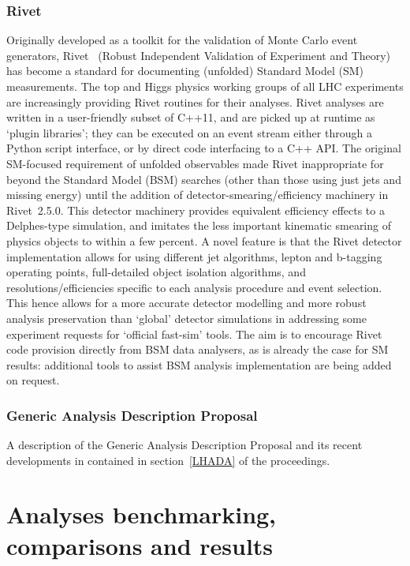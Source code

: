 \documentclass[11pt]{cernrep}
\begin{document}
\subsubsection{Rivet}
Originally developed as a toolkit for the validation of Monte Carlo event
generators, Rivet~\cite{Waugh:2006ip,Buckley:2010ar} (Robust Independent Validation of Experiment and
Theory) has become a standard for documenting (unfolded) Standard Model (SM)
measurements. The top and Higgs physics working groups of all LHC experiments
are increasingly providing Rivet routines for their analyses. Rivet analyses are
written in a user-friendly subset of C++11, and are picked up at runtime as
`plugin libraries'; they can be executed on an event stream either through a Python script interface, or by direct code interfacing to a C++ API.
The original SM-focused requirement of unfolded observables made Rivet
inappropriate for beyond the Standard Model (BSM) searches (other than those
using just jets and missing energy) until the addition of
detector-smearing/efficiency machinery in Rivet~2.5.0. This detector machinery provides equivalent efficiency effects to a Delphes-type simulation, and imitates the less important kinematic smearing of physics objects to within a few percent. A novel feature is that the Rivet detector implementation allows for using
different jet algorithms, lepton and b-tagging operating points, full-detailed object isolation algorithms, and resolutions/efficiencies specific to each
analysis procedure and event selection. This hence allows for a more accurate detector modelling and more robust analysis preservation than `global' detector simulations in addressing some experiment requests for `official fast-sim' tools. The aim is to encourage Rivet code provision directly from BSM data analysers, as is already the case for SM results: additional tools to assist BSM analysis implementation are being added on request.

\subsubsection{Generic Analysis Description Proposal}
A description of the Generic Analysis Description Proposal and its recent developments in contained in section~\ref{LHADA} of the proceedings.

\section{Analyses benchmarking, comparisons and results}
\end{document}
